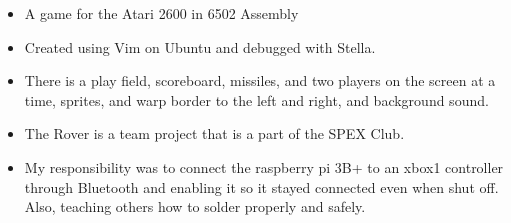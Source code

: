 \documentclass[10pt,a4paper]{altacv}
\begin{document}
%

\begin{itemize}
  \item A game for the Atari 2600 in 6502 Assembly
  \item Created using Vim on Ubuntu and debugged with Stella.
  \item There is a play field, scoreboard, missiles, and two players on the screen at a time, sprites, and warp border to the left and right, and background sound.
  
\end{itemize}
\divider

%


\begin{itemize}
  \item The Rover is a team project that is a part of the SPEX Club.
  \item My responsibility was to connect the raspberry pi 3B+ to an xbox1 controller through Bluetooth and enabling it so it stayed connected even when shut off. Also, teaching others how to solder properly and safely.
  
\end{itemize}
\bigskip 
\end{document}
